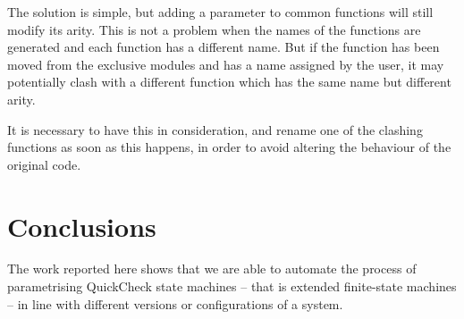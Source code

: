 The solution is simple, but adding a parameter to common functions
will still modify its arity. This is not a problem when the names
of the functions are generated and each function has a different name.
But if the function has been moved from the exclusive modules and
has a name assigned by the user, it may potentially clash with a different
function which has the same name but different arity.

It is necessary to have this in consideration, and rename one of the
clashing functions as soon as this happens, in order to avoid altering
the behaviour of the original code.



\section{Conclusions}
\label{concs}

The work reported here shows that we are able to automate the process of parametrising QuickCheck state machines -- that 
is extended finite-state machines -- in line with different versions or configurations of a system.

